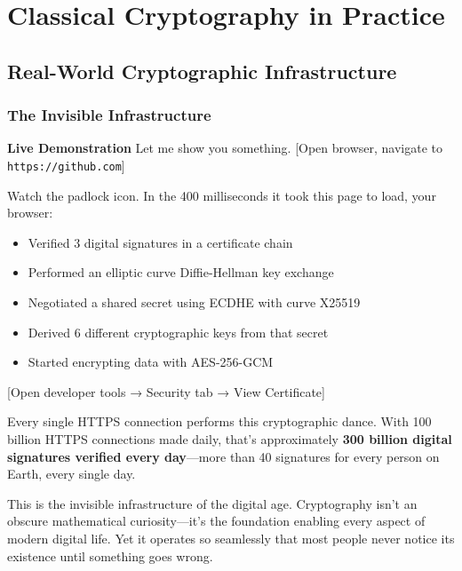 \documentclass[11pt,a4paper]{article}
\begin{document}
\section{Classical Cryptography in Practice}
\label{sec:classical-crypto}

\subsection{Real-World Cryptographic Infrastructure}
\label{sec:infrastructure}

\subsubsection{The Invisible Infrastructure}

\begin{frame}[fragile]
\textbf{Live Demonstration}
Let me show you something. [Open browser, navigate to \texttt{https://github.com}]

Watch the padlock icon. In the 400 milliseconds it took this page to load, your browser:
\begin{itemize}
    \item Verified 3 digital signatures in a certificate chain
    \item Performed an elliptic curve Diffie-Hellman key exchange  
    \item Negotiated a shared secret using ECDHE with curve X25519
    \item Derived 6 different cryptographic keys from that secret
    \item Started encrypting data with AES-256-GCM
\end{itemize}

[Open developer tools → Security tab → View Certificate]

Every single HTTPS connection performs this cryptographic dance. With 100 billion HTTPS connections made daily, that's approximately \textbf{300 billion digital signatures verified every day}---more than 40 signatures for every person on Earth, every single day.
\end{frame}

This is the invisible infrastructure of the digital age. Cryptography isn't an obscure mathematical curiosity---it's the foundation enabling every aspect of modern digital life. Yet it operates so seamlessly that most people never notice its existence until something goes wrong.
\end{document}

